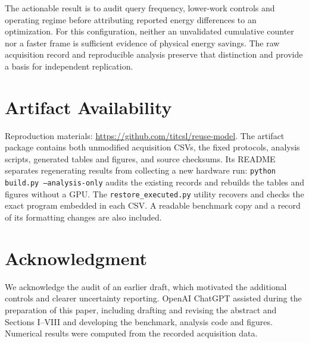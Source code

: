 \documentclass[10pt,conference]{IEEEtran}
\begin{document}
The actionable result is to audit query frequency, lower-work controls and operating regime before attributing reported energy differences to an optimization. For this configuration, neither an unvalidated cumulative counter nor a faster frame is sufficient evidence of physical energy savings. The raw acquisition record and reproducible analysis preserve that distinction and provide a basis for independent replication.

\section*{Artifact Availability}
Reproduction materials: \url{https://github.com/titcsl/reuse-model}. The artifact package contains both unmodified acquisition CSVs, the fixed protocols, analysis scripts, generated tables and figures, and source checksums. Its README separates regenerating results from collecting a new hardware run: \texttt{python build.py --analysis-only} audits the existing records and rebuilds the tables and figures without a GPU. The \texttt{restore\_executed.py} utility recovers and checks the exact program embedded in each CSV. A readable benchmark copy and a record of its formatting changes are also included.

\section*{Acknowledgment}
We acknowledge the audit of an earlier draft, which motivated the additional controls and clearer uncertainty reporting. OpenAI ChatGPT assisted during the preparation of this paper, including drafting and revising the abstract and Sections I--VIII and developing the benchmark, analysis code and figures. Numerical results were computed from the recorded acquisition data.
\end{document}
